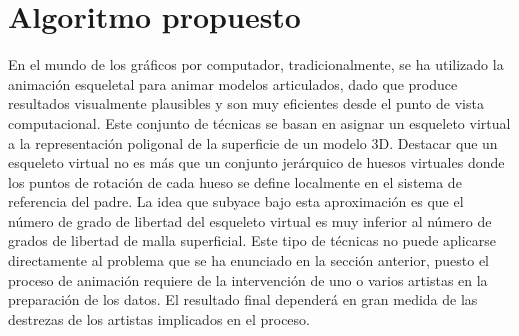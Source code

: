\section{Algoritmo propuesto}
\label{posing:method}
%

En el mundo de los gráficos por computador, tradicionalmente, se ha utilizado la animación esqueletal para animar modelos articulados, dado que produce resultados visualmente plausibles y son muy eficientes desde el punto de vista computacional. Este conjunto de técnicas se basan en asignar un esqueleto virtual a la representación poligonal de la superficie de un modelo 3D. Destacar que un esqueleto virtual no es más que un conjunto jerárquico de huesos virtuales donde los puntos de rotación de cada hueso se define localmente en el sistema de referencia del padre. 
La idea que subyace bajo esta aproximación es que el número de grado de libertad del esqueleto virtual es muy inferior al número de grados de libertad de malla superficial. Este tipo de técnicas no puede aplicarse directamente al problema que se ha enunciado en la sección anterior, puesto el proceso de animación requiere de la intervención de uno o varios artistas en la preparación de los datos. El resultado final dependerá en gran medida de las destrezas de los artistas implicados en el proceso. 

